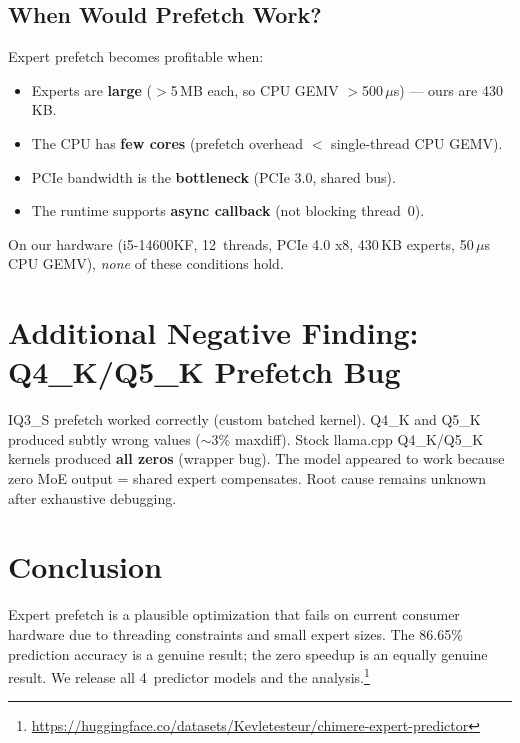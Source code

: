 \documentclass[10pt,a4paper]{article}
\begin{document}
\subsection{When Would Prefetch Work?}

Expert prefetch becomes profitable when:
\begin{itemize}
  \item Experts are \textbf{large} ($>$5\,MB each, so CPU GEMV $>$500\,$\mu$s) --- ours are 430\,KB.
  \item The CPU has \textbf{few cores} (prefetch overhead $<$ single-thread CPU GEMV).
  \item PCIe bandwidth is the \textbf{bottleneck} (PCIe 3.0, shared bus).
  \item The runtime supports \textbf{async callback} (not blocking thread~0).
\end{itemize}

On our hardware (i5-14600KF, 12~threads, PCIe 4.0 x8, 430\,KB experts, 50\,$\mu$s CPU GEMV), \emph{none} of these conditions hold.

\section{Additional Negative Finding: Q4\_K/Q5\_K Prefetch Bug}

IQ3\_S prefetch worked correctly (custom batched kernel). Q4\_K and Q5\_K produced subtly wrong values ($\sim$3\% maxdiff). Stock llama.cpp Q4\_K/Q5\_K kernels produced \textbf{all zeros} (wrapper bug). The model appeared to work because zero MoE output = shared expert compensates. Root cause remains unknown after exhaustive debugging.

\section{Conclusion}

Expert prefetch is a plausible optimization that fails on current consumer hardware due to threading constraints and small expert sizes. The 86.65\% prediction accuracy is a genuine result; the zero speedup is an equally genuine result. We release all 4~predictor models and the analysis.\footnote{\url{https://huggingface.co/datasets/Kevletesteur/chimere-expert-predictor}}
\end{document}
